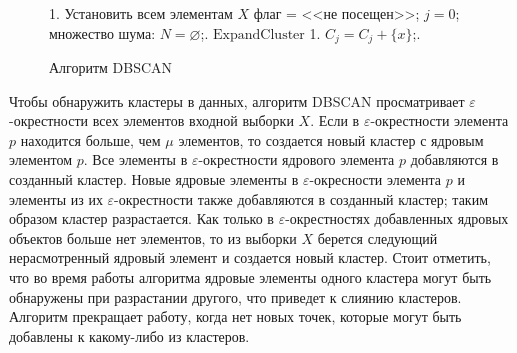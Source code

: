 \begin{figure}[t!]
    \begin{algorithm}[H]
        \DontPrintSemicolon
        1. Установить всем элементам \( X \) флаг = <<не посещен>>; \( j = 0 \); множество шума: \( N = \varnothing \);. 
        \BlankLine
        \( \mathrm{ExpandCluster} \)\;
        1. \( C_j = C_j + \{x\} \);. 
    \end{algorithm}
    \vspace*{-1.5em}
    \caption{Алгоритм DBSCAN}
    \label{alg:dbscan}
\end{figure}

Чтобы обнаружить кластеры в данных, алгоритм DBSCAN просматривает \( \varepsilon \)-окрестности всех элементов входной выборки \( X \). Если в \( \varepsilon \)-окрестности элемента \( p \) находится больше, чем \( \mu \) элементов, то создается новый кластер с ядровым элементом \( p \). Все элементы в \( \varepsilon \)-окрестности ядрового элемента \( p \) добавляются в созданный кластер. Новые ядровые элементы в \( \varepsilon \)-окресности элемента \( p \) и элементы из их \( \varepsilon \)-окрестности также добавляются в созданный кластер; таким образом кластер разрастается. Как только в \( \varepsilon \)-окрестностях добавленных ядровых объектов больше нет элементов, то из выборки \( X \) берется следующий нерасмотренный ядровый элемент и создается новый кластер. Стоит отметить, что во время работы алгоритма ядровые элементы одного кластера могут быть обнаружены при разрастании другого, что приведет к слиянию кластеров. Алгоритм прекращает работу, когда нет новых точек, которые могут быть добавлены к какому-либо из кластеров.

